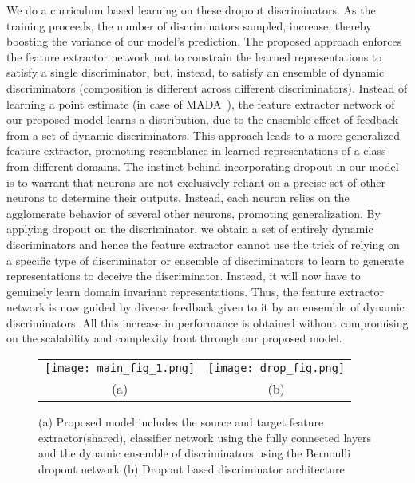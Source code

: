 \documentclass{bmvc2k}
\begin{document}
We do a curriculum based learning on these dropout discriminators. As the training proceeds, the number of discriminators sampled, increase, thereby boosting the variance of our model's prediction. The proposed approach enforces the feature extractor network not to constrain the learned representations to satisfy a single discriminator, but, instead, to satisfy an ensemble of dynamic discriminators (composition is different across different discriminators). Instead of learning a point estimate (in case of MADA~\cite{pei_arxiv2018}), the feature extractor network of our proposed model learns a distribution, due to the ensemble effect of feedback from a set of dynamic discriminators. This approach leads to a more generalized feature extractor, promoting resemblance in learned representations of a class from different domains.  The instinct behind incorporating dropout in our model is to warrant that neurons are not exclusively reliant on a precise set of other neurons to determine their outputs. Instead, each neuron relies on the agglomerate behavior of several other neurons, promoting generalization. By applying dropout on the discriminator, we obtain a set of entirely dynamic discriminators and hence the feature extractor cannot use the trick of relying on a specific type of discriminator or ensemble of discriminators to learn to generate representations to deceive the discriminator. Instead, it will now have to genuinely learn domain invariant representations. Thus, the feature extractor network is now guided by diverse feedback given to it by an ensemble of dynamic discriminators.
All this increase in performance is obtained without compromising on the scalability and complexity front through our proposed model. 

 
 
 




 
 
\begin{figure}
     \small
\begin{tabular}[b]{ c c }
\texttt{[image: main\_fig\_1.png]}
     & \texttt{[image: drop\_fig.png]}\\
     (a) & (b)
     
       \end{tabular}
      \caption{(a) Proposed model includes the source and target feature extractor(shared), classifier network using the fully connected layers and the dynamic ensemble of discriminators using the Bernoulli dropout network (b) Dropout based discriminator architecture }
      \label{fig:main}
 \end{figure}
\end{document}
